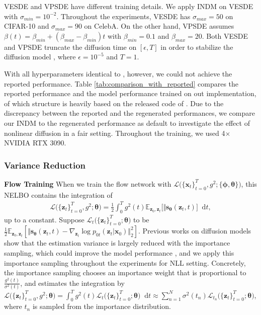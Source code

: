 \documentclass{article}
\theoremstyle{definition}
\theoremstyle{remark}
\newcommand*\diff{\mathop{}\!\mathrm{d}}
\begin{document}
	VESDE and VPSDE have different training details. We apply INDM on VESDE with $\sigma_{min}=10^{-2}$. Throughout the experiments, VESDE has $\sigma_{max}=50$ on CIFAR-10 and $\sigma_{max}=90$ on CelebA. On the other hand, VPSDE assumes $\beta(t)=\beta_{min}+(\beta_{max}-\beta_{min})t$ with $\beta_{min}=0.1$ and $\beta_{max}=20$. Both VESDE and VPSDE truncate the diffusion time on $[\epsilon,T]$ in order to stabilize the diffusion model \cite{kim2022soft}, where $\epsilon=10^{-5}$ and $T=1$. 
	
	With all hyperparameters identical to \citet{song2021maximum}, however, we could not achieve the reported performance. Table \ref{tab:comparison_with_reported} compares the reported performance and the model performance trained on out implementation, of which structure is heavily based on the released code of \cite{song2020score}. Due to the discrepancy between the reported and the regenerated performances, we compare our INDM to the regenerated performance as default to investigate the effect of nonlinear diffusion in a fair setting. Throughout the training, we used 4$\times$ NVIDIA RTX 3090.
	
	\subsubsection{Variance Reduction}
	
	\textbf{Flow Training} When we train the flow network with $\mathcal{L}\big(\{\mathbf{x}_{t}\}_{t=0}^{T},g^{2};\{\bm{\phi},\bm{\theta}\})$, this NELBO contains the integration of 
	\begin{align*}
	\mathcal{L}\big(\{\mathbf{z}_{t}\}_{t=0}^{T},g^{2};\bm{\theta}\big)=\frac{1}{2}\int_{0}^{T}g^{2}(t)\mathbb{E}_{\mathbf{z}_{0},\mathbf{z}_{t}}\big[\Vert\mathbf{s}_{\bm{\theta}}(\mathbf{z}_{t},t)\big]\diff t,
	\end{align*}
	up to a constant. Suppose $\mathcal{L}_{t}\big(\{\mathbf{z}_{t}\}_{t=0}^{T};\bm{\theta}\big)$ to be $\frac{1}{2}\mathbb{E}_{\mathbf{z}_{0},\mathbf{z}_{t}}[\Vert\mathbf{s}_{\bm{\theta}}(\mathbf{z}_{t},t)-\nabla_{\mathbf{z}_{t}}\log{p_{0t}(\mathbf{z}_{t}\vert\mathbf{x}_{0})}\Vert_{2}^{2}]$. Previous works on diffusion models \citep{nichol2021improved,huang2021variational,song2021maximum, kim2022soft} show that the estimation variance is largely reduced with the importance sampling, which could improve the model performance \citep{song2021maximum}, and we apply this importance sampling throughout the experiments for NLL setting. Concretely, the importance sampling chooses an importance weight that is proportional to $\frac{g^{2}(t)}{\sigma^{2}(t)}$, and estimates the integration by $\mathcal{L}\big(\{\mathbf{z}_{t}\}_{t=0}^{T},g^{2};\bm{\theta}\big)=\int_{0}^{T}g^{2}(t)\mathcal{L}_{t}\big(\{\mathbf{z}_{t}\}_{t=0}^{T};\bm{\theta}\big)\diff t\approx\sum_{n=1}^{N}\sigma^{2}(t_{n})\mathcal{L}_{t_{n}}\big(\{\mathbf{z}_{t}\}_{t=0}^{T};\bm{\theta}\big)$, where $t_{n}$ is sampled from the importance distribution.
	
\end{document}
